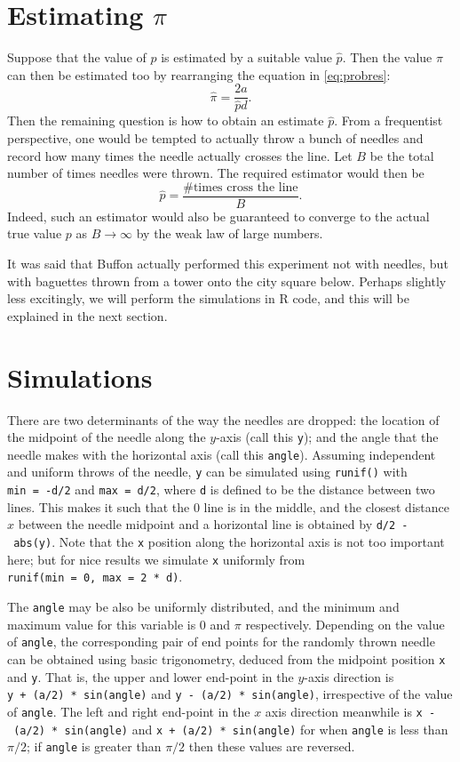 \documentclass[11pt]{article}
\begin{document}
\section{Estimating $\pi$}

Suppose that the value of \(p\) is estimated by a suitable value
\(\hat p\). 
Then the value \(\pi\) can then be estimated too by rearranging the equation in \eqref{eq:probres}: 
\begin{equation}
\hat\pi = \frac{2a}{\hat p d}.
\end{equation} 
Then the remaining question is how to obtain an estimate \(\hat p\). 
From a frequentist perspective, one would be tempted to actually throw a bunch of needles and record how many times the needle actually crosses the line. 
Let \(B\) be the total number of times needles were thrown. 
The required estimator would then be 
\[
\hat p = \frac{\text{\# times cross the line}}{B}.
\] 
Indeed, such an estimator would also be guaranteed to converge to the actual true value \(p\) as \(B\to\infty\) by the weak law of large numbers.

It was said that Buffon actually performed this experiment not with needles, but with baguettes thrown from a tower onto the city square below. 
Perhaps slightly less excitingly, we will perform the simulations in R code, and this will be explained in the next section.

\section{Simulations}

There are two determinants of the way the needles are dropped: 
the location of the midpoint of the needle along the \(y\)-axis (call this
\texttt{y}); 
and the angle that the needle makes with the horizontal axis (call this \texttt{angle}). 
Assuming independent and uniform throws of the needle, \texttt{y} can be simulated using \texttt{runif()} with \texttt{min\ =\ -d/2} and \texttt{max\ =\ d/2}, where \texttt{d} is defined to be the distance between two lines. 
This makes it such that the 0 line is in the middle, and the closest distance \(x\) between the needle midpoint and a horizontal line is obtained by \texttt{d/2\ -\ abs(y)}. 
Note that the \texttt{x} position along the horizontal axis is not too important here; 
but for nice results we simulate \texttt{x} uniformly from \texttt{runif(min\ =\ 0,\ max\ =\ 2\ *\ d)}.

The \texttt{angle} may be also be uniformly distributed, and the minimum and maximum value for this variable is 0 and \(\pi\) respectively. 
Depending on the value of \texttt{angle}, the corresponding pair of end points for the randomly thrown needle can be obtained using basic trigonometry, deduced from the midpoint position \texttt{x} and \texttt{y}. 
That is, the upper and lower end-point in the \(y\)-axis direction is \texttt{y\ +\ (a/2)\ *\ sin(angle)} and \texttt{y\ -\ (a/2)\ *\ sin(angle)}, irrespective of the value of \texttt{angle}. 
The left and right end-point in the \(x\) axis direction meanwhile is \texttt{x\ -\ (a/2)\ *\ sin(angle)} and \texttt{x\ +\ (a/2)\ *\ sin(angle)} for when \texttt{angle} is less than \(\pi/2\); if \texttt{angle} is greater than \(\pi/2\) then these values are reversed.
\end{document}

